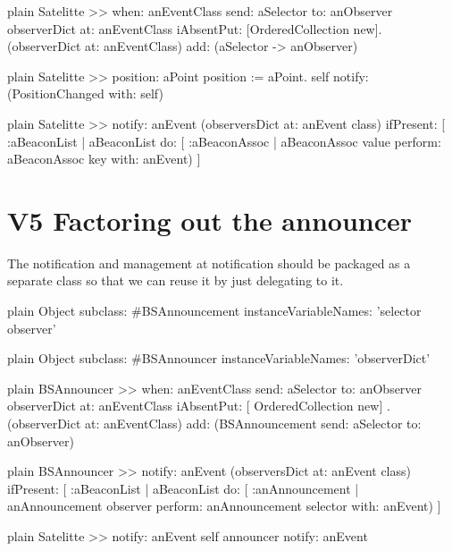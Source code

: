 \documentclass[10pt,twoside,english]{_support/latex/sbabook/sbabook}
\begin{document}
\begin{displaycode}{plain}
Satelitte >> when: anEventClass send: aSelector to: anObserver
	observerDict at: anEventClass iAbsentPut: [OrderedCollection new].
	(observerDict at: anEventClass) add: (aSelector -> anObserver)
\end{displaycode}

\begin{displaycode}{plain}
Satelitte >> position: aPoint
	position := aPoint. 
	self notify: (PositionChanged with: self)
\end{displaycode}

\begin{displaycode}{plain}
Satelitte >> notify: anEvent
	(observersDict at: anEvent class) ifPresent: [ :aBeaconList | 
		aBeaconList do: [ :aBeaconAssoc | 
			aBeaconAssoc value perform: aBeaconAssoc key with: anEvent) ]
\end{displaycode}
\section{V5 Factoring out the announcer}
The notification and management at notification should be packaged as a separate class so that we can reuse it by just delegating to it. 

\begin{displaycode}{plain}
Object subclass: #BSAnnouncement
	instanceVariableNames: 'selector observer'
\end{displaycode}

\begin{displaycode}{plain}
Object subclass: #BSAnnouncer
	instanceVariableNames: 'observerDict'
\end{displaycode}

\begin{displaycode}{plain}
BSAnnouncer >> when: anEventClass send: aSelector to: anObserver
	observerDict at: anEventClass iAbsentPut: [ OrderedCollection new] .
	(observerDict at: anEventClass) add: 
		(BSAnnouncement send: aSelector to: anObserver)
\end{displaycode}

\begin{displaycode}{plain}
BSAnnouncer >> notify: anEvent
	(observersDict at: anEvent class) ifPresent: [ :aBeaconList | 
		aBeaconList do: [ :anAnnouncement | 
			anAnnouncement observer
				perform: anAnnouncement selector 
				with: anEvent) ]
\end{displaycode}

\begin{displaycode}{plain}
Satelitte >> notify: anEvent
	self announcer notify: anEvent
\end{displaycode}
\end{document}

